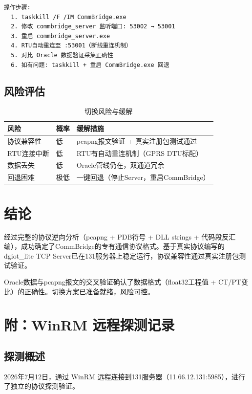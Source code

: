 \documentclass[12pt,a4paper]{ctexart}
\begin{document}
\begin{verbatim}
操作步骤:
  1. taskkill /F /IM CommBridge.exe
  2. 修改 commbridge_server 监听端口: 53002 → 53001
  3. 重启 commbridge_server.exe
  4. RTU自动重连至 :53001（断线重连机制）
  5. 对比 Oracle 数据验证采集正确性
  6. 如有问题: taskkill + 重启 CommBridge.exe 回退
\end{verbatim}

\subsection{风险评估}

\begin{table}[H]\centering
\caption{切换风险与缓解}
\begin{tabular}{p{3cm}p{2cm}p{5cm}}
\toprule
\textbf{风险} & \textbf{概率} & \textbf{缓解措施} \\
\midrule
协议兼容性 & 低 & pcapng报文验证 + 真实注册包测试通过 \\
RTU连接中断 & 低 & RTU有自动重连机制（GPRS DTU标配） \\
数据丢失 & 低 & Oracle管线仍在，双通道冗余 \\
回退困难 & 极低 & 一键回退（停止Server，重启CommBridge） \\
\bottomrule
\end{tabular}
\end{table}

\section{结论}

经过完整的协议逆向分析（pcapng + PDB符号 + DLL strings + 代码段反汇编），成功确定了CommBridge的专有通信协议格式。基于真实协议编写的dgiot\_lite TCP Server已在131服务器上稳定运行，协议兼容性通过真实注册包测试验证。

Oracle数据与pcapng报文的交叉验证确认了数据格式（float32工程值 + CT/PT变比）的正确性。切换方案已准备就绪，风险可控。

\newpage
\section{附：WinRM 远程探测记录}

\subsection{探测概述}

2026年7月12日，通过 WinRM 远程连接到131服务器（11.66.12.131:5985），进行了独立的协议探测验证。
\end{document}
